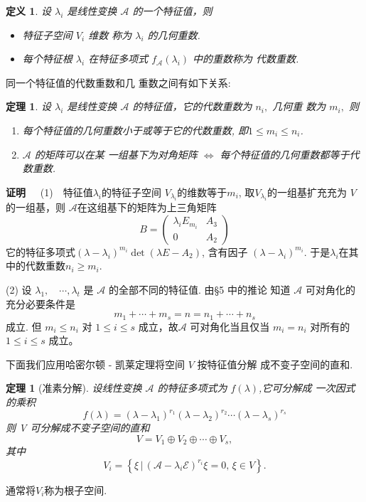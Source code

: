 \documentclass[13pt]{beamer}
\newtheorem{thm}{定理}
\newtheorem*{theo}{定理}
\newtheorem*{defi}{定义}
\def\pf{{\bf 证明~~ }}
\def\A{\mathscr{A}}
\begin{document}
\begin{frame}
\begin{defi}
	设 $\lambda_{i}$ 是线性变换 $\A$ 的一个特征值，则
	\begin{itemize}
		\item 特征子空间 $V_{i}$ 维数 称为 $\lambda_{i}$ 的\alert{几何重数}.
		\item 每个特征根 $\lambda_{i}$ 在特征多项式 $f_{\A}\left(\lambda_{i}\right)$ 中的重数称为 \alert{代数重数}.
	\end{itemize}
	
\end{defi}
同一个特征值的代数重数和几 重数之间有如下关系:
\begin{theo}
	设 $\lambda_{i}$ 是线性变换 $\A$ 的特征值，它的代数重数为 $n_{i},$ 几何重 数为 $m_{i},$ 则
	\begin{enumerate}
		\item 每个特征值的几何重数小于或等于它的代数重数, 即$1 \le m_{i} \le n_i$.
		\item  $\A$ 的矩阵可以在某
		一组基下为对角矩阵 $\Leftrightarrow$ 每个特征值的几何重数都等于代数重数.
	\end{enumerate}
\end{theo}
\end{frame}


\begin{frame}
\pf (1)~~特征值$\lambda_i$的特征子空间 $V_{\lambda_i}$的维数等于$m_i$, 取$V_{\lambda_i}$的一组基扩充充为 $V$ 的一组基，则 $\A$在这组基下的矩阵为上三角矩阵 
$$B=
\left(
\begin{array}{cc} 
\lambda_i E_{m_i} & A_{3} \\
 0 & A_{2}
\end{array}
\right)$$
它的特征多项式$(\lambda-\lambda_{i})^{m_i} \det \left(\lambda E - A_{2} \right) $, 含有因子 $(\lambda-\lambda_{i})^{m_i}$.  于是$\lambda_{i}$在其中的代数重数$n_i \ge m_i$.

(2) 设 $\lambda_{1}, \quad \cdots, \lambda_{t}$ 是 $\mathscr{A}$ 的全部不同的特征值. 由\S 5 中的推论  知道
$\A$ 可对角化的充分必要条件是
\[
m_{1}+\cdots+m_{s}=n=n_{1}+\cdots+n_{s}
\]
成立. 
但 $m_{i} \leqslant n_{i}$ 对 $1 \leqslant i \leqslant s$ 成立，故$\A$ 可对角化当且仅当 $m_{i}=n_{i}$ 对所有的 $1 \leqslant i \leqslant s$ 成立。
\end{frame}


\begin{frame}
 下面我们应用哈密尔顿 - 凯莱定理将空间 $V$ 按特征值分解 成不变子空间的直和.  
 \begin{thm}[准素分解]
 设线性变换 $\A$ 的特征多项式为 $f(\lambda)$,它可分解成
一次因式的乘积
\[
f(\lambda)=\left(\lambda-\lambda_{1}\right)^{r_{1}}\left(\lambda-\lambda_{2}\right)^{r_{2}} \cdots\left(\lambda-\lambda_{s}\right)^{r_{s}}
\]
则 V 可分解成不变子空间的直和
\[
V=V_{1} \oplus V_{2} \oplus \cdots \oplus V_{s},
\]
其中 
\[
V_{i}=\left\{\xi \, |\, \left(  \A -\lambda_{i} \mathscr{E} \right)^{r_i} \xi=0, \, \xi \in V\right\}.
\]
 \end{thm}
通常将$V_i$称为根子空间.
\end{frame}
\end{document}

